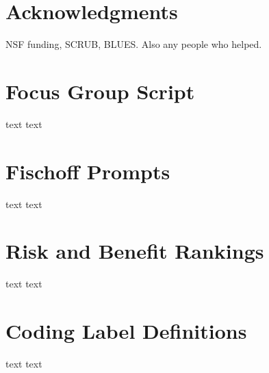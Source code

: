 \documentclass{acm_proc_article-sp}
\begin{document}

\section{Acknowledgments}
NSF funding, SCRUB, BLUES. Also any people who helped.







\appendix
\section{Focus Group Script}
\label{sec:script}

text text

\section{Fischoff Prompts}
\label{sec:prompt}

text text 

\section{Risk and Benefit Rankings}
\label{sec:techrank}

text text

\section{Coding Label Definitions}
\label{sec:coding}

text text

\balancecolumns

\end{document}
